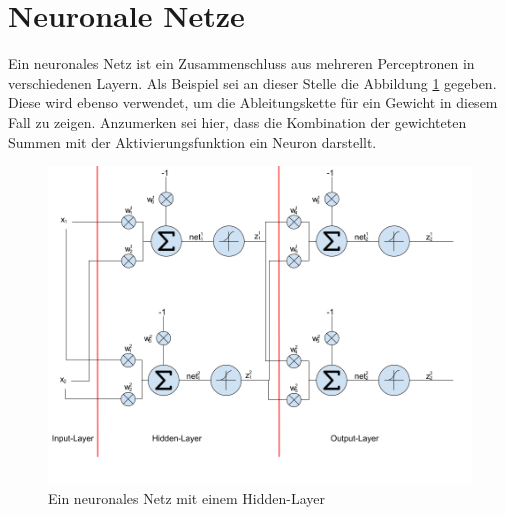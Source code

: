 \newpage
\section{Neuronale Netze}
Ein neuronales Netz ist ein Zusammenschluss aus mehreren Perceptronen in verschiedenen Layern. Als Beispiel sei an
dieser Stelle die Abbildung \ref{fig:07_neuronal_network} gegeben. Diese wird ebenso verwendet, um die Ableitungskette
für ein Gewicht in diesem Fall zu zeigen. Anzumerken sei hier, dass die Kombination der gewichteten Summen mit der
Aktivierungsfunktion ein Neuron darstellt.
\begin{figure}[h!]
    \begin{center}
        \includegraphics[width=1\linewidth]{../common/01_neuronal_network/00_resources/02_neuronales_netz.png}
    \end{center}
    \caption{Ein neuronales Netz mit einem Hidden-Layer}
    \label{fig:07_neuronal_network}
\end{figure}

\newpage
